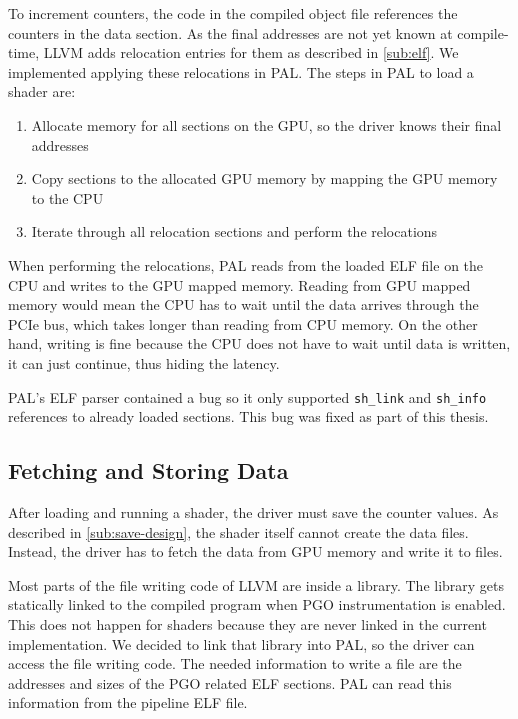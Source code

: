 To increment counters, the code in the compiled object file references the counters in the data section.
As the final addresses are not yet known at compile-time, LLVM adds relocation entries for them as described in \cref{sub:elf}.
We implemented applying these relocations in PAL. The steps in PAL to load a shader are:
\begin{enumerate}
	\item Allocate memory for all sections on the GPU, so the driver knows their final addresses
	\item Copy sections to the allocated GPU memory by mapping the GPU memory to the CPU
	\item Iterate through all relocation sections and perform the relocations
\end{enumerate}
When performing the relocations, PAL reads from the loaded ELF file on the CPU and writes to the GPU mapped memory.
Reading from GPU mapped memory would mean the CPU has to wait until the data arrives through the PCIe bus, which takes longer than reading from CPU memory.
On the other hand, writing is fine because the CPU does not have to wait until data is written, it can just continue, thus hiding the latency.

PAL's ELF parser contained a bug so it only supported \texttt{sh\_link} and \texttt{sh\_info} references to already loaded sections. This bug was fixed as part of this thesis.


\subsection{Fetching and Storing Data}
\label{sub:save}
After loading and running a shader, the driver must save the counter values.
As described in \cref{sub:save-design}, the shader itself cannot create the data files.
Instead, the driver has to fetch the data from GPU memory and write it to files.

Most parts of the file writing code of LLVM are inside a library.
The library gets statically linked to the compiled program when PGO instrumentation is enabled.
This does not happen for shaders because they are never linked in the current implementation.
We decided to link that library into PAL, so the driver can access the file writing code.
The needed information to write a file are the addresses and sizes of the PGO related ELF sections.
PAL can read this information from the pipeline ELF file.

